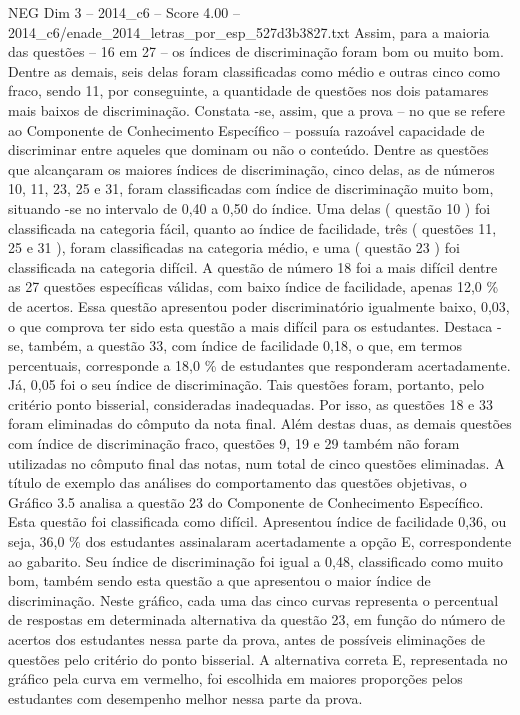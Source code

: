 \begin{textsample}{NEG Dim 3 – 2014\_c6 – Score 4.00 – 2014\_c6/enade\_2014\_letras\_por\_esp\_527d3b3827.txt}
Assim, para a maioria das questões – 16 em 27 – os índices de discriminação foram bom ou muito bom.
Dentre as demais, seis delas foram classificadas como médio e outras cinco como fraco, sendo 11, por conseguinte, a quantidade de questões nos dois patamares mais baixos de discriminação.
Constata -se, assim, que a prova – no que se refere ao Componente de Conhecimento Específico – possuía razoável capacidade de discriminar entre aqueles que dominam ou não o conteúdo.
Dentre as questões que alcançaram os maiores índices de discriminação, cinco delas, as de números 10, 11, 23, 25 e 31, foram classificadas com índice de discriminação muito bom, situando -se no intervalo de 0,40 a 0,50 do índice.
Uma delas ( questão 10 ) foi classificada na categoria fácil, quanto ao índice de facilidade, três ( questões 11, 25 e 31 ), foram classificadas na categoria médio, e uma ( questão 23 ) foi classificada na categoria difícil.
A questão de número 18 foi a mais difícil dentre as 27 questões específicas válidas, com baixo índice de facilidade, apenas 12,0 \% de acertos.
Essa questão apresentou poder discriminatório igualmente baixo, 0,03, o que comprova ter sido esta questão a mais difícil para os estudantes.
Destaca -se, também, a questão 33, com índice de facilidade 0,18, o que, em termos percentuais, corresponde a 18,0 \% de estudantes que responderam acertadamente.
Já, 0,05 foi o seu índice de discriminação.
Tais questões foram, portanto, pelo critério ponto bisserial, consideradas inadequadas.
Por isso, as questões 18 e 33 foram eliminadas do cômputo da nota final.
Além destas duas, as demais questões com índice de discriminação fraco, questões 9, 19 e 29 também não foram utilizadas no cômputo final das notas, num total de cinco questões eliminadas.
A título de exemplo das análises do comportamento das questões objetivas, o Gráfico 3.5 analisa a questão 23 do Componente de Conhecimento Específico.
Esta questão foi classificada como difícil.
Apresentou índice de facilidade 0,36, ou seja, 36,0 \% dos estudantes assinalaram acertadamente a opção E, correspondente ao gabarito.
Seu índice de discriminação foi igual a 0,48, classificado como muito bom, também sendo esta questão a que apresentou o maior índice de discriminação.
Neste gráfico, cada uma das cinco curvas representa o percentual de respostas em determinada alternativa da questão 23, em função do número de acertos dos estudantes nessa parte da prova, antes de possíveis eliminações de questões pelo critério do ponto bisserial.
A alternativa correta E, representada no gráfico pela curva em vermelho, foi escolhida em maiores proporções pelos estudantes com desempenho melhor nessa parte da prova.

\end{textsample}
